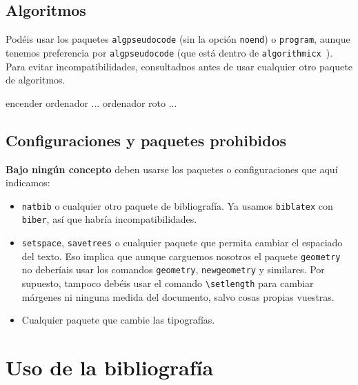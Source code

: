 \documentclass{TEMat-article}
\begin{document}
\subsection{Algoritmos}
Podéis usar los paquetes \verb+algpseudocode+ (sin la opción \verb+noend+) o \verb+program+, aunque tenemos preferencia por \verb+algpseudocode+ (que está dentro de \verb+algorithmicx+~\cite{algorithmicx}).
Para evitar incompatibilidades, consultadnos antes de usar cualquier otro paquete de algoritmos.

\begin{algoritmo}
\begin{algorithmic}[1]
\State encender ordenador
\State ... 
\Else
\State ordenador roto
\EndIf
\EndIf
\Else
\State ... 
\EndIf
\EndIf
\EndProcedure
\end{algorithmic}
\end{algoritmo}

\subsection{Configuraciones y paquetes prohibidos}
\textbf{Bajo ningún concepto} deben usarse los paquetes o configuraciones que aquí indicamos:
\begin{itemize}
\item \verb+natbib+ o cualquier otro paquete de bibliografía.
  Ya usamos \verb+biblatex+ con \verb+biber+, así que habría incompatibilidades.
\item \verb+setspace+, \verb+savetrees+ o cualquier paquete que permita cambiar el espaciado del texto.
  Eso implica que aunque carguemos nosotros el paquete \verb+geometry+ no deberíais usar los comandos \verb+geometry+, \verb+newgeometry+ y similares.
  Por supuesto, tampoco debéis usar el comando \verb+\setlength+ para cambiar márgenes ni ninguna medida del documento, salvo cosas propias vuestras.
\item Cualquier paquete que cambie las tipografías.
\end{itemize}

\section{Uso de la bibliografía}
\end{document}

